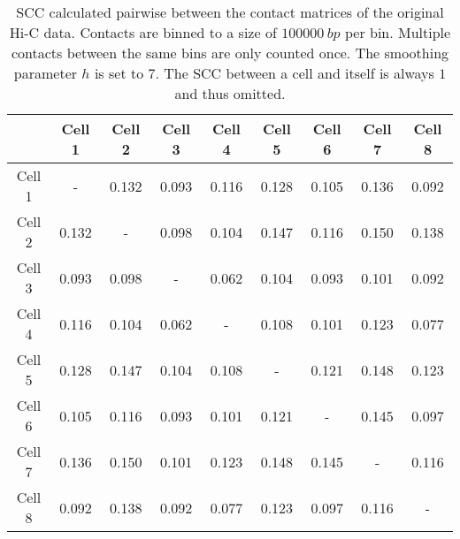 \begin{table}[ht]
\centering
  \caption{SCC calculated pairwise between the contact matrices of the original Hi-C data. Contacts are binned to a size of \(\SI{100000}{bp}\) per bin. Multiple contacts between the same bins are only counted once. The smoothing parameter \(h\) is set to \(7\). The SCC between a cell and itself is always \(1\) and thus omitted.}
  \label{tab:scc_hic}
  \begin{tabular}{S | S S S S S S S S}
   & {Cell 1} & {Cell 2} & {Cell 3} & {Cell 4} & {Cell 5} & {Cell 6} & {Cell 7} & {Cell 8} \\
  \midrule
    {Cell 1} &  {-}  & 0.132 & 0.093 & 0.116 & 0.128 & 0.105 & 0.136 & 0.092 \\
    {Cell 2} & 0.132 &  {-}  & 0.098 & 0.104 & 0.147 & 0.116 & 0.150 & 0.138 \\
    {Cell 3} & 0.093 & 0.098 &  {-}  & 0.062 & 0.104 & 0.093 & 0.101 & 0.092 \\
    {Cell 4} & 0.116 & 0.104 & 0.062 &  {-}  & 0.108 & 0.101 & 0.123 & 0.077 \\
    {Cell 5} & 0.128 & 0.147 & 0.104 & 0.108 &  {-}  & 0.121 & 0.148 & 0.123 \\
    {Cell 6} & 0.105 & 0.116 & 0.093 & 0.101 & 0.121 &  {-}  & 0.145 & 0.097 \\
    {Cell 7} & 0.136 & 0.150 & 0.101 & 0.123 & 0.148 & 0.145 &  {-}  & 0.116 \\
    {Cell 8} & 0.092 & 0.138 & 0.092 & 0.077 & 0.123 & 0.097 & 0.116 &  {-}  \\
  \end{tabular}
\end{table}

